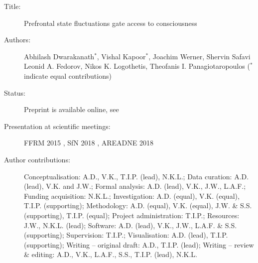 \begin{description}
\item[Title:]
  Prefrontal state fluctuations gate access to consciousness
\item[Authors:]
  Abhilash Dwarakanath$^*$,
  Vishal Kapoor$^*$,
  Joachim Werner,
  Shervin Safavi
  Leonid A. Fedorov,
  Nikos K. Logothetis,
  Theofanis I. Panagiotaropoulos
  ($^*$ indicate equal contributions) 
\item[Status:]
  Preprint is available online, see \citet{dwarakanathBistabilityPrefrontalStates2023}
\item[Presentation at scientific meetings:]
  FFRM 2015 \cite{antoniouPerceptualModulationPupillary2015a},
  SfN 2018 \cite{panagiotaropoulosModulationNeuralDischarges2018a},
  AREADNE 2018 \cite{dwarakanathPerisynapticActivityPrefrontal2018}
\item[Author contributions: ]
  
  Conceptualisation: A.D., V.K., T.I.P. (lead), N.K.L.;
  Data curation: A.D. (lead), V.K. and J.W.;
  Formal analysis: A.D. (lead), V.K., J.W., L.A.F.;
  Funding acquisition: N.K.L.;
  Investigation: A.D. (equal), V.K. (equal), T.I.P. (supporting);
  Methodology: A.D. (equal), V.K. (equal), J.W. \& S.S. (supporting), T.I.P. (equal);
  Project administration: T.I.P.;
  Resources: J.W., N.K.L. (lead);
  Software: A.D. (lead), V.K., J.W., L.A.F. \& S.S. (supporting);
  Supervision: T.I.P.;
  Visualisation: A.D. (lead), T.I.P. (supporting);
  Writing -- original draft: A.D., T.I.P. (lead);
  Writing -- review \& editing: A.D., V.K., L.A.F., S.S., T.I.P. (lead), N.K.L.

\end{description}

